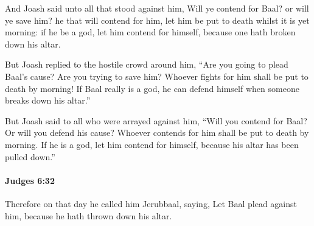 			\begin{versebox}
					\item[BHS] 
					\item[ASV] And Joash said unto all that stood against him, Will ye contend for Baal? or will ye save him? he that will contend for him, let him be put to death whilst it is yet morning: if he be a god, let him contend for himself, because one hath broken down his altar.
					\item[NIV] But Joash replied to the hostile crowd around him, “Are you going to plead Baal’s cause? Are you trying to save him? Whoever fights for him shall be put to death by morning! If Baal really is a god, he can defend himself when someone breaks down his altar.”
					\item[NRSV] But Joash said to all who were arrayed against him, “Will you contend for Baal? Or will you defend his cause? Whoever contends for him shall be put to death by morning. If he is a god, let him contend for himself, because his altar has been pulled down.”
			\end{versebox}

		\paragraph{Judges 6:32} %
			\label{JUDGES-6-32}

			Therefore on that day he called him Jerubbaal, saying, Let Baal plead against him, because he hath thrown down his altar.

